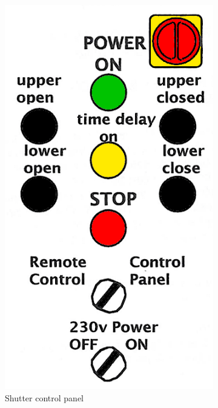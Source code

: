 \documentclass[12pt,titlepage]{article}
\begin{document}
\begin{figure}[H]
    \centering
    \begin{subfigure}[t]{0.4\textwidth}
        \centering
        \includegraphics[width=.8\textwidth]{./images/dome/shutter_ctrl_panel.png}
        \caption{Shutter control panel}
    \end{subfigure}%
    \begin{subfigure}[t]{0.4\textwidth}
        \centering

\end{subfigure}
\end{figure}
\end{document}
